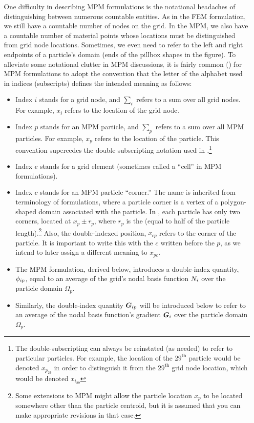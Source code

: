 One difficulty in describing MPM formulations is the notational headaches of distinguishing between numerous countable entities. As in the FEM formulation, we still have a countable number of nodes on the grid. In the MPM, we also have a countable number of material points whose locations must be distinguished from grid node locations. Sometimes, we even need to refer to the left and right endpoints of a particle's domain (ends of the pillbox shapes in the figure). To alleviate some notational clutter in MPM discussions, it is fairly common (\cf \cite{Bardenhagen2004}) for MPM formulations to adopt the convention that the letter of the alphabet used in indices (subscripts) defines the intended meaning as follows:
\begin{itemize}
  \item Index $i$ stands for a grid node, and $\sum_i$ refers to a sum over all grid nodes. For example, $x_i$ refers to the location of the \ith grid node.
  \item Index $p$ stands for an MPM particle, and $\sum_p$ refers to a sum over all MPM particles.  For example, $x_p$ refers to the location of the \pth particle. This convention supercedes the double subscripting notation used in .\footnote{The double-subscripting can always be reinstated (as needed) to refer to particular particles. For example, the location of the $29^\text{th}$ particle would be denoted $x_{p_{29}}$ in order to distinguish it from the $29^\text{th}$ grid node location, which would be denoted $x_{i_{29}}$}
  \item Index $e$ stands for a grid element (sometimes called a ``cell'' in MPM formulations).
  \item Index $c$ stands for an MPM particle ``corner.''  The name  is inherited from terminology of \twoD formulations, where a particle corner is a vertex of a polygon-shaped domain associated with the particle. In \oneD, each particle has only two corners, located at $x_p\pm r_p$, where $r_p$ is the  (equal to half of the particle length).\footnote{Some extensions to MPM might allow the particle location $x_p$ to be located somewhere other than the particle centroid, but it is assumed that you can make appropriate revisions in that case.} Also, the double-indexed position, $x_{cp}$ refers to the \cth corner of the \pth particle.  It is important to write this with the $c$ written before the $p$, as we intend to later assign a different meaning to $x_{pc}$.
  \item The MPM formulation, derived below, introduces a double-index quantity, ${\phi_{ip}}$, equal to an average of the grid's \ith nodal basis function ${N}_i$ over the \pth particle domain $\Omega_p$.
  \item Similarly, the double-index quantity ${\bm{G}_{ip}}$ will be introduced below to refer to an average of the \ith nodal basis function's gradient $\bm{G}_i$ over the \pth particle domain $\Omega_p$.
\end{itemize}

